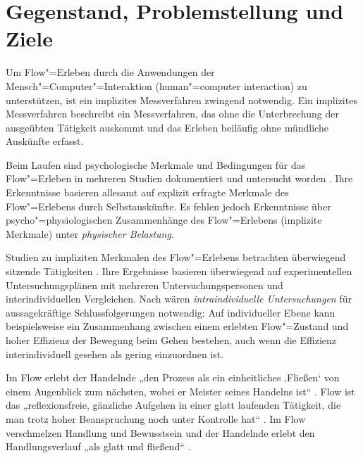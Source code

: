 

\section{Gegenstand, Problemstellung und Ziele} 

\label{sec:gegenstand_problemstellung_und_ziele}

Um Flow"=Erleben durch die Anwendungen der Mensch"=Computer"=Interaktion (human"=computer interaction) zu unterstützen, ist ein implizites Messverfahren zwingend notwendig. Ein implizites Messverfahren beschreibt ein Messverfahren, das ohne die Unterbrechung der ausgeübten Tätigkeit auskommt und das Erleben beiläufig ohne mündliche Auskünfte erfasst.

Beim Laufen sind psychologische Merkmale und Bedingungen für das Flow"=Erleben in mehreren Studien dokumentiert und untersucht worden \citep{Stoll2005, Reinhardt2006, Schuler2009, Jimenez-Torres2013}. Ihre Erkenntnisse basieren allesamt auf explizit erfragte Merkmale des Flow"=Erlebens durch Selbstauskünfte. Es fehlen jedoch Erkenntnisse über psycho"=physiologischen Zusammenhänge des Flow"=Erlebens (implizite Merkmale) unter \emph{physischer Belastung}. 

Studien zu impliziten Merkmalen des Flow"=Erlebens betrachten überwiegend sitzende Tätigkeiten \citep{deManzano2010, Keller2011, Peifer2014, Tozman2015, Harmat2015}. Ihre Ergebnisse basieren überwiegend auf experimentellen Untersuchungsplänen mit mehreren Untersuchungspersonen und interindividuellen Vergleichen. Nach \citet[][S.77]{Henk2014} wären \emph{intraindividuelle Untersuchungen} für aussagekräftige Schlussfolgerungen notwendig: Auf individueller Ebene kann beispielsweise ein Zusammenhang zwischen einem erlebten Flow"=Zustand und hoher Effizienz der Bewegung beim Gehen bestehen, auch wenn die Effizienz interindividuell gesehen als gering einzuordnen ist.

Im Flow erlebt der Handelnde „den Prozess als ein einheitliches ‚Fließen‘ von einem Augenblick zum nächsten, wobei er Meister seines Handelns ist“ \citep[][S.~59]{Csikszentmihalyi2010}. Flow ist das „reflexionsfreie, gänzliche Aufgehen in einer glatt laufenden Tätigkeit, die man trotz hoher Beanspruchung noch unter Kontrolle hat“ \citep[][S.~156]{Rheinberg2003}. Im Flow verschmelzen Handlung und Bewusstsein und der Handelnde erlebt den Handlungsverlauf „als glatt und fließend“ \citep[][S.~13]{Henk2014}.

